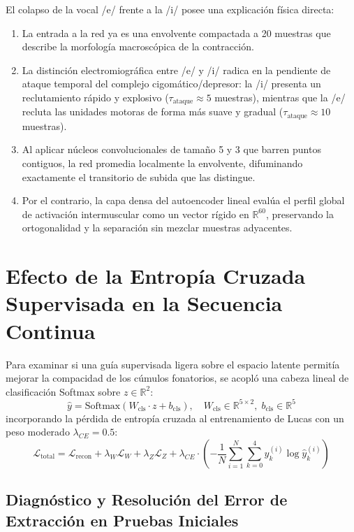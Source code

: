 \documentclass[11pt,a4paper,openany]{book}
\theoremstyle{definition}
\begin{document}
El colapso de la vocal /e/ frente a la /i/ posee una explicación física directa:
\begin{enumerate}
    \item La entrada a la red ya es una envolvente compactada a 20 muestras que describe la morfología macroscópica de la contracción.
    \item La distinción electromiográfica entre /e/ y /i/ radica en la pendiente de ataque temporal del complejo cigomático/depresor: la /i/ presenta un reclutamiento rápido y explosivo ($\tau_{\text{ataque}} \approx 5$ muestras), mientras que la /e/ recluta las unidades motoras de forma más suave y gradual ($\tau_{\text{ataque}} \approx 10$ muestras).
    \item Al aplicar núcleos convolucionales de tamaño 5 y 3 que barren puntos contiguos, la red promedia localmente la envolvente, difuminando exactamente el transitorio de subida que las distingue.
    \item Por el contrario, la capa densa del autoencoder lineal evalúa el perfil global de activación intermuscular como un vector rígido en $\mathbb{R}^{60}$, preservando la ortogonalidad y la separación sin mezclar muestras adyacentes.
\end{enumerate}

\section{Efecto de la Entropía Cruzada Supervisada en la Secuencia Continua}
\label{sec:entropia_cruzada}

Para examinar si una guía supervisada ligera sobre el espacio latente permitía mejorar la compacidad de los cúmulos fonatorios, se acopló una cabeza lineal de clasificación Softmax sobre $z \in \mathbb{R}^2$:
\begin{equation}
    \hat{y} = \text{Softmax}(W_{\text{cls}} \cdot z + b_{\text{cls}}), \quad W_{\text{cls}} \in \mathbb{R}^{5 \times 2}, \; b_{\text{cls}} \in \mathbb{R}^5
\end{equation}
incorporando la pérdida de entropía cruzada al entrenamiento de Lucas con un peso moderado $\lambda_{CE} = 0.5$:
\begin{equation}
    \mathcal{L}_{\text{total}} = \mathcal{L}_{\text{recon}} + \lambda_W \mathcal{L}_W + \lambda_Z \mathcal{L}_Z + \lambda_{CE} \cdot \left( -\frac{1}{N} \sum_{i=1}^N \sum_{k=0}^4 y_k^{(i)} \log \hat{y}_k^{(i)} \right)
\end{equation}

\subsection{Diagnóstico y Resolución del Error de Extracción en Pruebas Iniciales}
\label{subsec:error_extraccion}
\end{document}
